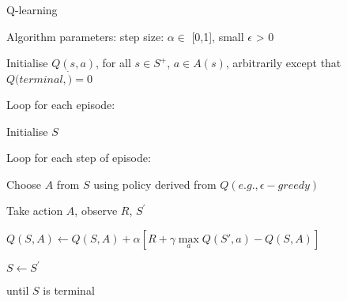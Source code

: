 \documentclass[../Head/Main.tex]{subfiles}
\begin{document}
\begin{Pseudo}{Q-learning}{}
\begin{Indentation}
    \item Algorithm parameters: step size: $\alpha\in$ [0,1], small  $\epsilon$ > 0 \vspace{-2pt}
    \item Initialise $Q(s,a)$, for all $s\in S^{+}$, $a\in A(s)$, arbitrarily except that $Q(terminal,\dot)=0$
    \item Loop for each episode: \vspace{-2pt}
    \begin{Indentation}
        \item Initialise $S$ \vspace{-2pt}
        \item Loop for each step of episode: \vspace{-2pt}
        \begin{Indentation}
            \item Choose $A$ from $S$ using policy derived from $Q(e.g., \epsilon-greedy)$ \vspace{-2pt}
            \item Take action $A$, observe $R$, $S^{'}$ \vspace{-1pt}
            \item $Q(S,A) \leftarrow Q(S,A) + \alpha \left[R + \gamma \max\limits_{a} Q(S',a) - Q(S,A)\right]$
            \item $S\leftarrow S^{'}$ \vspace{-2pt}
        \end{Indentation}
        \item until $S$ is terminal 
    \end{Indentation}
\end{Indentation}
\end{Pseudo}
\end{document}
